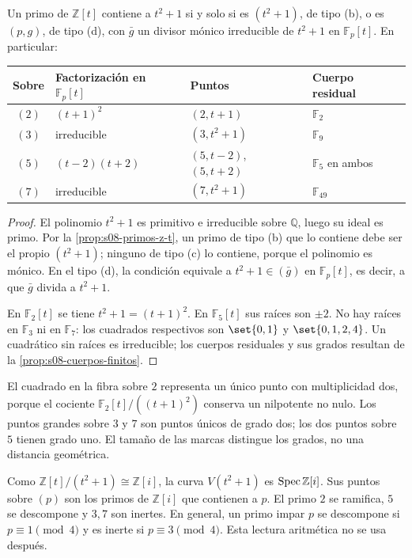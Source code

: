 \begin{prop}
\label{prop:s08-puntos-curva-gaussiana}
Un primo de $\mathbb Z[t]$ contiene a $t^2+1$ si y solo si es $(t^2+1)$, de tipo (b), o es $(p,g)$, de tipo (d), con $\bar g$ un divisor mónico irreducible de $t^2+1$ en $\mathbb F_p[t]$. En particular:
\begin{center}
\normalfont\small
\renewcommand{\arraystretch}{1.25}
\begin{tabular}{clll}
\hline
Sobre & Factorización en $\mathbb F_p[t]$ & Puntos & Cuerpo residual\\
\hline
$(2)$ & $(t+1)^2$ & $(2,t+1)$ & $\mathbb F_2$\\
$(3)$ & irreducible & $(3,t^2+1)$ & $\mathbb F_9$\\
$(5)$ & $(t-2)(t+2)$ & $(5,t-2)$, $(5,t+2)$ & $\mathbb F_5$ en ambos\\
$(7)$ & irreducible & $(7,t^2+1)$ & $\mathbb F_{49}$\\
\hline
\end{tabular}
\end{center}
\end{prop}
\begin{proof}
El polinomio $t^2+1$ es primitivo e irreducible sobre $\mathbb Q$, luego su ideal es primo. Por la \cref{prop:s08-primos-z-t}, un primo de tipo (b) que lo contiene debe ser el propio $(t^2+1)$; ninguno de tipo (c) lo contiene, porque el polinomio es mónico. En el tipo (d), la condición equivale a $t^2+1\in(\bar g)$ en $\mathbb F_p[t]$, es decir, a que $\bar g$ divida a $t^2+1$.

En $\mathbb F_2[t]$ se tiene $t^2+1=(t+1)^2$. En $\mathbb F_5[t]$ sus raíces son $\pm2$. No hay raíces en $\mathbb F_3$ ni en $\mathbb F_7$: los cuadrados respectivos son $\set{0,1}$ y $\set{0,1,2,4}$. Un cuadrático sin raíces es irreducible; los cuerpos residuales y sus grados resultan de la \cref{prop:s08-cuerpos-finitos}.
\end{proof}

El cuadrado en la fibra sobre $2$ representa un único punto con multiplicidad dos, porque el cociente $\mathbb F_2[t]/((t+1)^2)$ conserva un nilpotente no nulo. Los puntos grandes sobre $3$ y $7$ son puntos únicos de grado dos; los dos puntos sobre $5$ tienen grado uno. El tamaño de las marcas distingue los grados, no una distancia geométrica.

\begin{obs}
\label{obs:s08-descomposicion-gaussiana}
Como $\mathbb Z[t]/(t^2+1)\cong\mathbb Z[i]$, la curva $V(t^2+1)$ es $\operatorname{Spec}\mathbb Z[i]$. Sus puntos sobre $(p)$ son los primos de $\mathbb Z[i]$ que contienen a $p$. El primo $2$ se ramifica, $5$ se descompone y $3,7$ son inertes. En general, un primo impar $p$ se descompone si $p\equiv1\pmod4$ y es inerte si $p\equiv3\pmod4$. Esta lectura aritmética no se usa después.
\end{obs}

